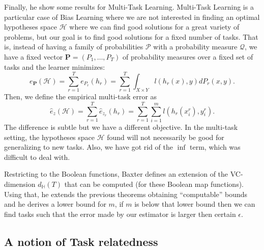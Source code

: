 Finally, he show some results for Multi-Task Learning. 
Multi-Task Learning is a particular case of Bias Learning where we are not interested in finding an optimal hypotheses space $\mathcal{H}$ where we can find good solutions for a great variety of problems, but our goal is to find good solutions for a fixed number of tasks. That is, instead of having a family of probabilities $\mathcal{P}$ with a probability measure $\mathcal{Q}$, we have a fixed vector $\bm{P} = (P_1, \ldots, P_T)$ of probability measures over a fixed set of tasks and the learner minimizes:
\begin{equation}
    e_{\bm{P}}(\mathcal{H}) = \sum_{r=1}^T e_{P_r}(h_r)  = \sum_{r=1}^T \int_{X \times Y} l(h_r(x), y) d P_r(x, y) .
\end{equation}
Then, we define the empirical multi-task error as
\begin{equation}\label{eq:mtllearn_exprisk}
    \hat{e}_z(\mathcal{H}) = \sum_{r=1}^T \hat{e}_{z_r}(h_r) = \sum_{r=1}^T \sum_{i=1}^m l(h_r(x_i^r), y_i^r).
\end{equation}
The difference is subtle but we have a different objective. In the multi-task setting, the hypotheses space $\mathcal{H}$ found will not necessarily be good for generalizing to new tasks. Also, we have got rid of the $\inf$ term, which was difficult to deal with.
%

Restricting to the Boolean functions, Baxter defines an extension of the VC-dimension $d_\mathbb{H}(T)$ that can be computed (for these Boolean map functions). Using that, he extends the previous theorems obtaining ``computable'' bounds and he derives a lower bound for $m$, if $m$ is below that lower bound then we can find tasks such that the error made by our estimator is larger then certain $\epsilon$.










\subsection{A notion of Task relatedness} %

